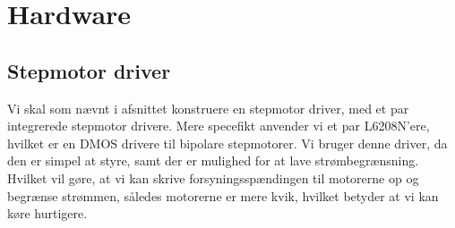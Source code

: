 \chapter[Implementering af hardware]{Hardware}


\section{Stepmotor driver}
Vi skal som nævnt i afsnittet  konstruere en
stepmotor driver, med et par integrerede stepmotor drivere. Mere
specefikt anvender vi et par L6208N'ere, hvilket er en DMOS drivere
til bipolare stepmotorer. Vi bruger denne driver, da den er simpel at
styre, samt der er mulighed for at lave strømbegrænsning. Hvilket vil
gøre, at vi kan skrive forsyningsspændingen til motorerne op og
begrænse strømmen, således motorerne er mere kvik, hvilket betyder at
vi kan køre hurtigere.


